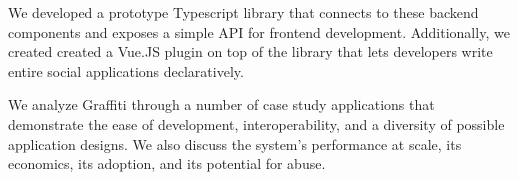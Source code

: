 We developed a prototype Typescript library that connects to these backend components and exposes a simple API for frontend development. Additionally, we created created a Vue.JS plugin on top of the library that lets developers write entire social applications declaratively.

We analyze Graffiti through a number of case study applications that demonstrate the ease of development, interoperability, and a diversity of possible application designs.
We also discuss the system's performance at scale, its economics, its adoption, and its potential for abuse.




%




